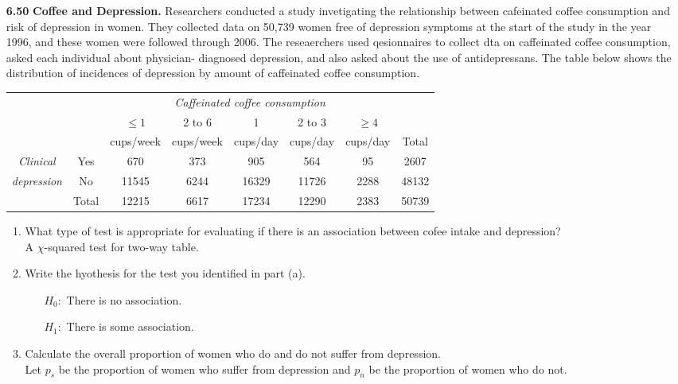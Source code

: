 \documentclass[a4paper, 12pt]{../../config/homework}
\begin{document}
\begin{enumerate}
\pagebreak
\item[\textbf{6.50}] \textbf{Coffee and Depression.} Researchers conducted a study invetigating the relationship between cafeinated coffee consumption and risk of depression in women. They collected data on 50,739 women free of depression symptoms at the start of the study in the year 1996, and these women were followed through 2006. The reseaerchers used qesionnaires to collect dta on caffeinated coffee consumption, asked each individual about physician- diagnosed depression, and also asked about the use of antidepressans. The table below shows the distribution of incidences of depression by amount of caffeinated coffee consumption.
\begin{table}[h]
    \centering
    \begin{tabular}{cccccccc}
     &  & \multicolumn{5}{c}{\textit{Caffeinated coffee consumption}} &  \\ \cline{3-7}
     &  & \(\le 1\) & 2 to 6 & 1 & 2 to 3 & \(\ge 4\) &  \\
     &  & cups/week & cups/week & cups/day & cups/day & cups/day & Total \\ \cline{2-8}
    \textit{Clinical} & Yes & 670 & 373 & 905 & 564 & 95 & 2607 \\
    \textit{depression} & No & 11545 & 6244 & 16329 & 11726 & 2288 & 48132 \\ \cline{2-8}
     & Total & 12215 & 6617 & 17234 & 12290 & 2383 & 50739 \\ \cline{2-8}
    \end{tabular}
    \end{table}
\begin{enumerate}[label=(\alph*)]
\item What type of test is appropriate for evaluating if there is an association between cofee intake and depression?
\\A \(\chi \)-squared test for two-way table.
\item Write the hyothesis for the test you identified in part (a).
\begin{enumerate}
\item[\(H_0 : \)] There is no association.
\item[\(H_1 : \)] There is some association.
\end{enumerate}
\item Calculate the overall proportion of women who do and do not suffer from depression.
\\Let \(p_s\) be the proportion of women who suffer from depression and \(p_n\) be the proportion of women who do not.

\end{enumerate}
\end{enumerate}
\end{document}
